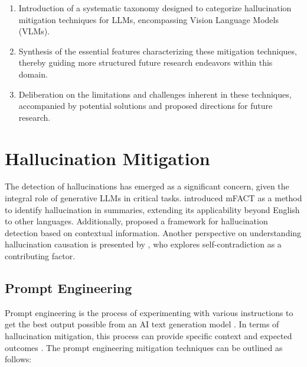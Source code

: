 \documentclass[11pt]{article}
\begin{document}
\begin{enumerate}
    \item {Introduction of a systematic taxonomy designed to categorize hallucination mitigation techniques for LLMs, encompassing Vision Language Models (VLMs).}
    \item {Synthesis of the essential features characterizing these mitigation techniques, thereby guiding more structured future research endeavors within this domain.}
    \item {Deliberation on the limitations and challenges inherent in these techniques, accompanied by potential solutions and proposed directions for future research.}
\end{enumerate}


\section{Hallucination Mitigation}






The detection of hallucinations has emerged as a significant concern, given the integral role of generative LLMs in critical tasks. \cite{qiu2023detecting} introduced mFACT as a method to identify hallucination in summaries, extending its applicability beyond English to other languages. Additionally, \cite{zhang2023knowledge} proposed a framework for hallucination detection based on contextual information. Another perspective on understanding hallucination causation is presented by \cite{mundler2023self}, who explores self-contradiction as a contributing factor.



\subsection{Prompt Engineering}
\label{subsec:Prompt Engineering}
Prompt engineering is the process of experimenting with various instructions to get the best output possible from an AI text generation model \cite{white2023prompt}. In terms of hallucination mitigation, this process can provide specific context and expected outcomes \cite{feldman2023trapping}. The prompt engineering mitigation techniques can be outlined as follows:
\end{document}

